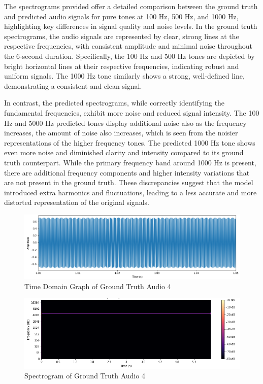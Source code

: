 \documentclass{ioereport}
\begin{document}
    
    The spectrograms provided offer a detailed comparison between the ground truth and predicted audio signals for pure tones at 100 Hz, 500 Hz, and 1000 Hz, highlighting key differences in signal quality and noise levels. In the ground truth spectrograms, the audio signals are represented by clear, strong lines at the respective frequencies, with consistent amplitude and minimal noise throughout the 6-second duration. Specifically, the 100 Hz and 500 Hz tones are depicted by bright horizontal lines at their respective frequencies, indicating robust and uniform signals. The 1000 Hz tone similarly shows a strong, well-defined line, demonstrating a consistent and clean signal.

    In contrast, the predicted spectrograms, while correctly identifying the fundamental frequencies, exhibit more noise and reduced signal intensity. The 100 Hz and 5000 Hz predicted tones display additional noise also as the frequency increases, the amount of noise also increases, which is seen from the noisier representations of the higher frequency tones. The predicted 1000 Hz tone shows even more noise and diminished clarity and intensity compared to its ground truth counterpart. While the primary frequency band around 1000 Hz is present, there are additional frequency components and higher intensity variations that are not present in the ground truth. These discrepancies suggest that the model introduced extra harmonics and fluctuations, leading to a less accurate and more distorted representation of the original signals. 

    \begin{figure}[H]
        \centering
        \includegraphics[width=\linewidth]{assets/audio_results/puretone5000hztime.png}
        \caption{Time Domain Graph of Ground Truth Audio 4}
        \label{fig:gt-pure5000-time}
    \end{figure}
    \begin{figure}[H]
        \centering
        \includegraphics[width=\linewidth]{assets/audio_results/puretone5000hzspec.png}
        \caption{Spectrogram of Ground Truth Audio 4}
        \label{fig:gt-pure5000-spec}
    \end{figure}
    
\end{document}

